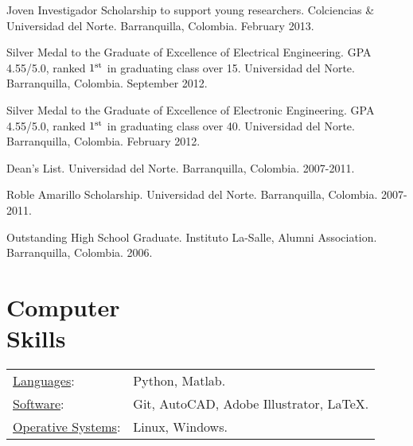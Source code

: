 \documentclass[margin]{res}
\begin{document}
\begin{resume}
Joven Investigador Scholarship to support young researchers.
Colciencias \& Universidad del Norte. Barranquilla, Colombia. February 2013.

Silver Medal to the Graduate of Excellence of Electrical Engineering.
GPA 4.55/5.0, ranked ${1^{{\rm{st}}}}$ in graduating class over 15.
Universidad del Norte. Barranquilla, Colombia. September 2012.

Silver Medal to the Graduate of Excellence of Electronic Engineering.
GPA 4.55/5.0, ranked ${1^{{\rm{st}}}}$ in graduating class over 40.
Universidad del Norte. Barranquilla, Colombia. February 2012.

Dean's List. Universidad del Norte. Barranquilla, Colombia. 2007-2011.

Roble Amarillo Scholarship. Universidad del Norte. 
Barranquilla, Colombia. 2007-2011.

Outstanding High School Graduate. Instituto La-Salle, Alumni Association.
Barranquilla, Colombia. 2006.


\section{Computer \\ Skills}
   \begin{tabular}{l p{3in}}
    \underline{Languages}: & Python, Matlab. \\

    \underline{Software}: & Git, AutoCAD, Adobe Illustrator, LaTeX. \\
    
    \underline{Operative Systems}: & Linux, Windows. \\
 \end{tabular}

\end{resume} 
\end{document}
